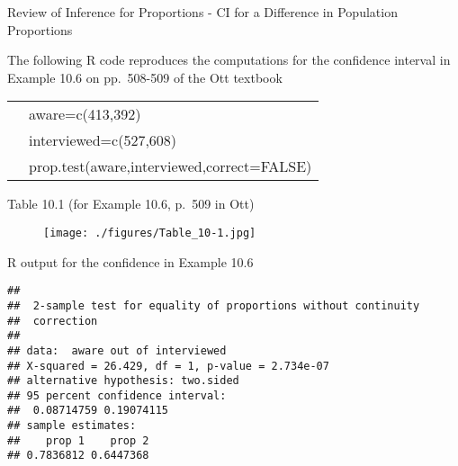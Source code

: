\documentclass[12pt,ignorenonframetext,aspectratio=169]{beamer}
\begin{document}
\begin{frame}{Review of Inference for Proportions - CI for a Difference
in Population Proportions}

The following R code reproduces the computations for the confidence
interval in Example 10.6 on pp.~508-509 of the Ott textbook

\begin{table}
\centering
\begin{tabular}{ll}
\hspace{3em} & aware=c(413,392) \\
\hspace{3em} & interviewed=c(527,608) \\
\hspace{3em} & prop.test(aware,interviewed,correct=FALSE) \\
\end{tabular}
\end{table}


\end{frame}

\begin{frame}{Table 10.1 (for Example 10.6, p.~509 in Ott)}

\begin{figure}[htbp]
\centering
\texttt{[image: ./figures/Table\_10-1.jpg]}
\caption{}
\end{figure}

\note{}

\end{frame}

\begin{frame}[fragile]{R output for the confidence in Example 10.6}

\begin{verbatim}
## 
##  2-sample test for equality of proportions without continuity
##  correction
## 
## data:  aware out of interviewed
## X-squared = 26.429, df = 1, p-value = 2.734e-07
## alternative hypothesis: two.sided
## 95 percent confidence interval:
##  0.08714759 0.19074115
## sample estimates:
##    prop 1    prop 2 
## 0.7836812 0.6447368
\end{verbatim}

\note{}

\end{frame}
\end{document}
